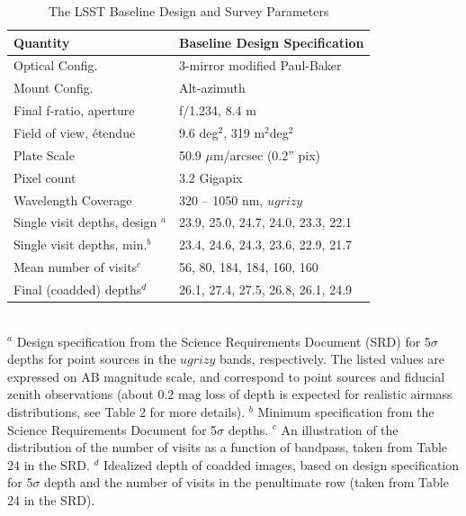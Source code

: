 \documentclass{emulateapj}
\begin{document}
\begin{table}
\caption{The LSST Baseline Design and Survey Parameters}
\begin{tabular}{|l|l|}
\hline  
   Quantity                         &     Baseline Design Specification    \\
\hline  
Optical Config.                           &  3-mirror modified Paul-Baker        \\
Mount Config.                            &  Alt-azimuth          \\
Final f-ratio, aperture                 &  f/1.234, 8.4 m                \\
Field of view, \'etendue              &  9.6 deg$^2$,   319 m$^2$deg$^2$     \\
Plate Scale                                  &  50.9 $\mu$m/arcsec (0.2'' pix)  \\
Pixel count                                  &  3.2 Gigapix  \\
Wavelength Coverage                   &  320 -- 1050 nm, $ugrizy$             \\
Single visit depths, design $^a$  &  23.9, 25.0, 24.7, 24.0, 23.3, 22.1    \\
Single visit depths, min.$^b$       &  23.4, 24.6, 24.3, 23.6, 22.9, 21.7    \\
Mean number of visits$^c$          &  56, 80, 184, 184, 160, 160               \\ 
Final (coadded) depths$^d$         &  26.1, 27.4, 27.5, 26.8, 26.1, 24.9     \\
\hline                         
\end{tabular}
\\ \vskip 0.05in
$^a$ Design specification from the Science Requirements Document (SRD) for 5$\sigma$ depths 
for point sources in the $ugrizy$ bands, respectively. The listed values are expressed on AB magnitude 
scale, and correspond to point sources and fiducial zenith observations (about 0.2 mag loss of depth 
is expected for realistic airmass distributions, see Table 2 for more details).
$^b$ Minimum specification from the Science Requirements Document for 5$\sigma$ depths.
$^c$ An illustration of the distribution of the number of visits as a function of bandpass, 
taken from Table 24 in the SRD.  
$^d$ Idealized depth of coadded images, based on design specification for 5$\sigma$ depth and 
the number of visits in the penultimate row (taken from Table 24 in the SRD). 
\vskip 0.2in          
\end{table}
\end{document}
